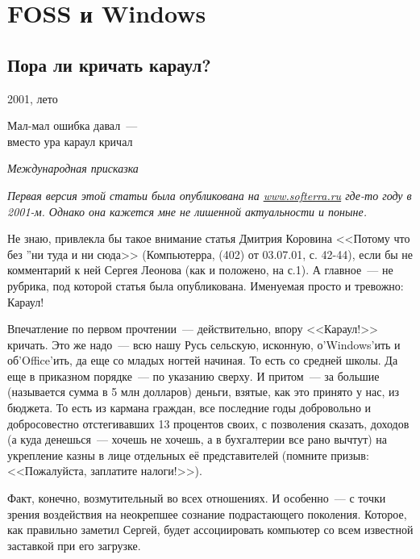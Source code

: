 \chapter{FOSS и Windows}

\section{Пора ли кричать караул?} 
\begin{timeline}
2001, лето
\end{timeline}

\hfill \begin{minipage}[h]{0.45\textwidth}
Мал-мал ошибка давал~--- \\
вместо ура караул кричал
\begin{flushright}
\textit{Международная присказка}  
\end{flushright}
\bigskip\end{minipage}

\textsl{Первая версия этой статьи была опубликована на \url{www.softerra.ru} где-то году в 2001-м. Однако она кажется мне не лишенной актуальности и поныне.}\medskip

Не знаю, привлекла бы такое внимание статья Дмитрия Коровина <<Потому что без \textquotedblright ни туда и ни сюда>> (Компьютерра,  (402) от 03.07.01, с. 42-44), если бы не комментарий к ней Сергея Леонова (как и положено, на с.1). А главное~--- не рубрика, под которой статья была опубликована. Именуемая просто и тревожно: Караул!

Впечатление по первом прочтении~--- действительно, впору <<Караул!>> кричать. Это же надо~--- всю нашу Русь сельскую, исконную, о'Windows'ить и об'Office'ить, да еще со младых ногтей начиная. То есть со средней школы. Да еще в приказном порядке~--- по указанию сверху. И притом~--- за большие (называется сумма в 5 млн долларов) деньги, взятые, как это принято у нас, из бюджета. То есть из кармана граждан, все последние годы добровольно и добросовестно отстегивавших 13 процентов своих, с позволения сказать, доходов (а куда денешься~--- хочешь не хочешь, а в бухгалтерии все рано вычтут) на укрепление казны в лице отдельных её представителей (помните призыв: <<Пожалуйста, заплатите налоги!>>).

Факт, конечно, возмутительный во всех отношениях. И особенно~--- с точки зрения воздействия на неокрепшее сознание подрастающего поколения. Которое, как правильно заметил Сергей, будет ассоциировать компьютер со всем известной заставкой при его загрузке.

